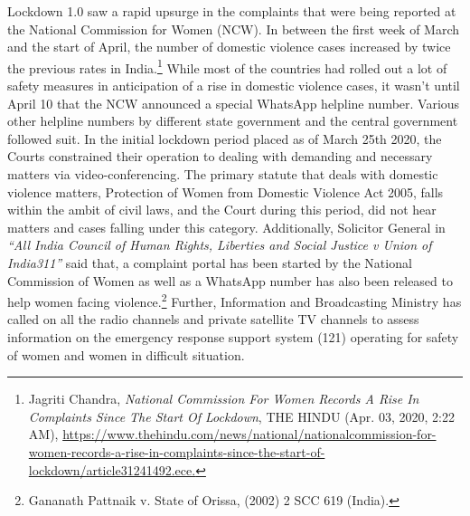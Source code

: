 \begin{multicols}{2}

\noi
Lockdown 1.0 saw a rapid upsurge in the complaints that were being reported at the National
Commission for Women (NCW). In between the first week of March and the start of April,
the number of domestic violence cases increased by twice the previous rates in India.\footnote{Jagriti Chandra, \textit{National Commission For Women Records A Rise In Complaints Since The Start Of
Lockdown}, THE HINDU (Apr. 03, 2020, 2:22 AM), \url{https://www.thehindu.com/news/national/nationalcommission-for-women-records-a-rise-in-complaints-since-the-start-of-lockdown/article31241492.ece.}} While
most of the countries had rolled out a lot of safety measures in anticipation of a rise in
domestic violence cases, it wasn’t until April 10 that the NCW announced a special
WhatsApp helpline number. Various other helpline numbers by different state government
and the central government followed suit. In the initial lockdown period placed as of March
25th 2020, the Courts constrained their operation to dealing with demanding and necessary
matters via video-conferencing. The primary statute that deals with domestic violence
matters, Protection of Women from Domestic Violence Act 2005, falls within the ambit of
civil laws, and the Court during this period, did not hear matters and cases falling under this
category. Additionally, Solicitor General in \textit{“All India Council of Human Rights, Liberties
and Social Justice v Union of India311”} said that, a complaint portal has been started by the
National Commission of Women as well as a WhatsApp number has also been released to
help women facing violence.\footnote{Gananath Pattnaik v. State of Orissa, (2002) 2 SCC 619 (India).} Further, Information and Broadcasting Ministry has called on
all the radio channels and private satellite TV channels to assess information on the
emergency response support system (121) operating for safety of women and women in
difficult situation. 


\end{multicols}
